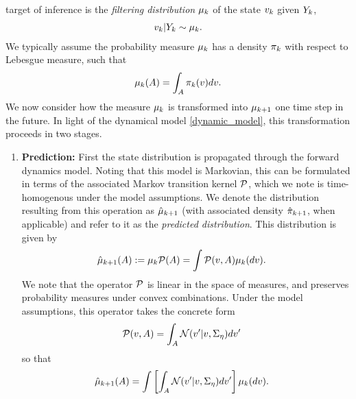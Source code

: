 \documentclass[12pt]{article}
\begin{document}
target of inference is the \textit{filtering distribution} $\filterMeas$ of the state $\dstate$ given $\dataObsCum$, 
\begin{align}
\dstate|\dataObsCum \sim \filterMeas.
\end{align}
We typically assume the probability measure $\filterMeas$ has a density $\filterDens$ with respect to Lebesgue measure, such that 
\[
\filterMeas(A) = \int_A \filterDens(\state) d\state. 
\]
We now consider how the measure $\filterMeas$ is transformed into $\filterMeas[\timeStep+1]$ one time step in the future. In light of the dynamical model \ref{dynamic_model}, this transformation 
proceeds in two stages. 
\begin{enumerate}
\item \textbf{Prediction:} First the state distribution is propagated through the forward dynamics model. Noting that this model is Markovian, this can be formulated in terms of the associated 
Markov transition kernel $\predictOp$, which we note is time-homogenous under the model assumptions. We denote the distribution resulting from this operation as $\predictMeas[\timeStep+1]$
(with associated density $\predictDens[\timeStep+1]$, when applicable) and refer to it as the \textit{predicted distribution}. This distribution is given by 
\begin{align}
\predictMeas[\timeStep+1](A) := \filterMeas \predictOp(A) &= \int \predictOp(\state, A) \filterMeas(d\state).
\end{align}
We note that the operator $\predictOp$ is linear in the space of measures, and preserves probability measures under convex combinations. Under the model assumptions, this operator 
takes the concrete form 
\begin{align*}
\predictOp(\state, A) &= \int_A \Gaussian(\state^\prime | \state, \CovNoiseDynamic) d\state^\prime
\end{align*}
so that 
\begin{align}
\predictMeas[\timeStep+1](A) &= \int \left[\int_A \Gaussian(\state^\prime | \state, \CovNoiseDynamic) d\state^\prime\right] \filterMeas(d\state). \label{predict_integral}
\end{align}


\end{enumerate}
\end{document}
